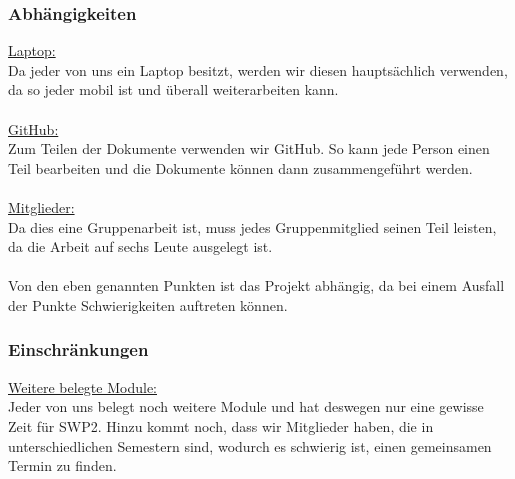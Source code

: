 \documentclass[fontsize=12pt,paper=a4,twoside]{scrartcl}
\begin{document}
\subsubsection{Abhängigkeiten}

\underline{Laptop:} \\
Da jeder von uns ein Laptop besitzt, werden wir diesen hauptsächlich verwenden, da so jeder mobil ist und überall weiterarbeiten kann.\\
\bigskip \\
\underline{GitHub:} \\
Zum Teilen der Dokumente verwenden wir GitHub. So kann jede Person einen Teil bearbeiten und die Dokumente können dann zusammengeführt werden. \\
\bigskip \\
\underline{Mitglieder:} \\
Da dies eine Gruppenarbeit ist, muss jedes Gruppenmitglied seinen Teil leisten, da die Arbeit auf sechs Leute ausgelegt ist. \\
\bigskip \\
Von den eben genannten Punkten ist das Projekt abhängig, da bei einem Ausfall der Punkte Schwierigkeiten auftreten können.

\subsubsection{Einschränkungen}
\underline{Weitere belegte Module:} \\
Jeder von uns belegt noch weitere Module und hat deswegen nur eine gewisse Zeit für SWP2. Hinzu kommt noch, dass wir Mitglieder haben, die in unterschiedlichen Semestern sind, wodurch es schwierig ist, einen gemeinsamen Termin zu finden. \\
\end{document}
